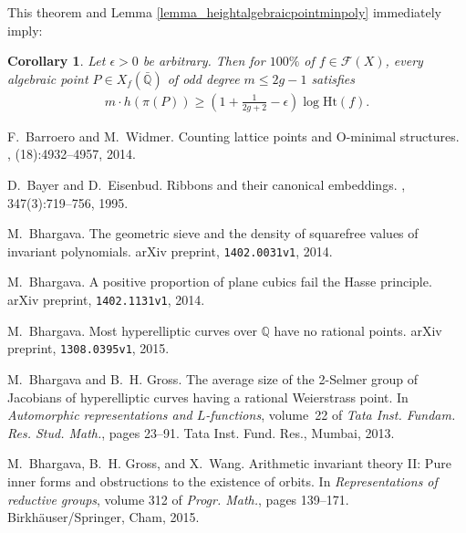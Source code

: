 \documentclass{article} %
\newtheorem{corollary}[proposition]{Corollary}
\numberwithin{equation}{section}
\newcommand{\Q}{\mathbb{Q}}
\newcommand{\height}{\mathrm{Ht}}
\begin{document}
This theorem and Lemma \ref{lemma_heightalgebraicpointminpoly} immediately imply:

\begin{corollary}
    Let $\epsilon>0$ be arbitrary. Then for $100\%$ of $f\in \mathcal{F}(X)$, every algebraic point $P\in X_f(\bar{\Q})$ of odd degree $m\leq 2g-1$ satisfies
    \begin{align*}
        m\cdot h(\pi(P)) \geq \left(1 + \frac{1}{2g+2} -\epsilon \right) \log \height(f).
    \end{align*}
\end{corollary}



\begin{thebibliography}{10}

F.~Barroero and M.~Widmer.
\newblock Counting lattice points and {O}-minimal structures.
, (18):4932--4957, 2014.

D.~Bayer and D.~Eisenbud.
\newblock Ribbons and their canonical embeddings.
, 347(3):719--756, 1995.

M.~Bhargava.
\newblock The geometric sieve and the density of squarefree values of invariant
  polynomials.
\newblock arXiv preprint, \texttt{1402.0031v1}, 2014.

M.~Bhargava.
\newblock A positive proportion of plane cubics fail the {H}asse principle.
\newblock arXiv preprint, \texttt{1402.1131v1}, 2014.

M.~Bhargava.
\newblock Most hyperelliptic curves over {$\mathbb{Q}$} have no rational
  points.
\newblock arXiv preprint, \texttt{1308.0395v1}, 2015.

M.~Bhargava and B.~H. Gross.
\newblock The average size of the 2-{S}elmer group of {J}acobians of
  hyperelliptic curves having a rational {W}eierstrass point.
\newblock In {\em Automorphic representations and {$L$}-functions}, volume~22
  of {\em Tata Inst. Fundam. Res. Stud. Math.}, pages 23--91. Tata Inst. Fund.
  Res., Mumbai, 2013.

M.~Bhargava, B.~H. Gross, and X.~Wang.
\newblock Arithmetic invariant theory {II}: {P}ure inner forms and obstructions
  to the existence of orbits.
\newblock In {\em Representations of reductive groups}, volume 312 of {\em
  Progr. Math.}, pages 139--171. Birkh\"{a}user/Springer, Cham, 2015.


\end{thebibliography}
\end{document}
